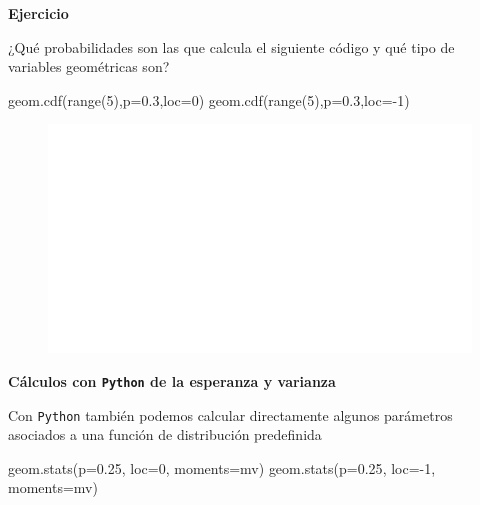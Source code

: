 \documentclass[
  letterpaper,
  DIV=11,
  numbers=noendperiod]{scrreprt}
\newenvironment{Shaded}{\begin{snugshade}}{\end{snugshade}}
\newcommand{\BuiltInTok}[1]{\textcolor[rgb]{0.00,0.23,0.31}{#1}}
\newcommand{\DecValTok}[1]{\textcolor[rgb]{0.68,0.00,0.00}{#1}}
\newcommand{\FloatTok}[1]{\textcolor[rgb]{0.68,0.00,0.00}{#1}}
\newcommand{\NormalTok}[1]{\textcolor[rgb]{0.00,0.23,0.31}{#1}}
\newcommand{\OperatorTok}[1]{\textcolor[rgb]{0.37,0.37,0.37}{#1}}
\newcommand{\StringTok}[1]{\textcolor[rgb]{0.13,0.47,0.30}{#1}}
\begin{document}
\textbf{Ejercicio}

¿Qué probabilidades son las que calcula el siguiente código y qué tipo
de variables geométricas son?

\begin{Shaded}
\begin{Highlighting}[]
\NormalTok{geom.cdf(}\BuiltInTok{range}\NormalTok{(}\DecValTok{5}\NormalTok{),p}\OperatorTok{=}\FloatTok{0.3}\NormalTok{,loc}\OperatorTok{=}\DecValTok{0}\NormalTok{)}
\NormalTok{geom.cdf(}\BuiltInTok{range}\NormalTok{(}\DecValTok{5}\NormalTok{),p}\OperatorTok{=}\FloatTok{0.3}\NormalTok{,loc}\OperatorTok{={-}}\DecValTok{1}\NormalTok{)}
\end{Highlighting}
\end{Shaded}

\begin{figure}[H]

{\centering \includegraphics{3_files/figure-pdf/unnamed-chunk-25-11.pdf}

}

\end{figure}

\textbf{Cálculos con \texttt{Python} de la esperanza y varianza}

Con \texttt{Python} también podemos calcular directamente algunos
parámetros asociados a una función de distribución predefinida

\begin{Shaded}
\begin{Highlighting}[]
\NormalTok{geom.stats(p}\OperatorTok{=}\FloatTok{0.25}\NormalTok{, loc}\OperatorTok{=}\DecValTok{0}\NormalTok{, moments}\OperatorTok{=}\StringTok{\textquotesingle{}mv\textquotesingle{}}\NormalTok{)}
\NormalTok{geom.stats(p}\OperatorTok{=}\FloatTok{0.25}\NormalTok{, loc}\OperatorTok{={-}}\DecValTok{1}\NormalTok{, moments}\OperatorTok{=}\StringTok{\textquotesingle{}mv\textquotesingle{}}\NormalTok{)}
\end{Highlighting}
\end{Shaded}
\end{document}
